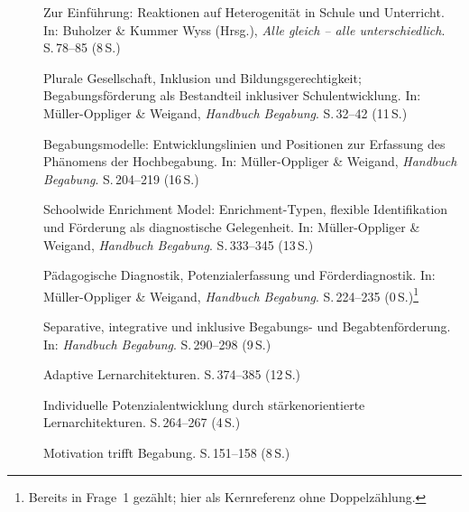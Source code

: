 \documentclass[ngerman, a4paper]{article}
\begin{document}
\begin{description}
  \item[\cite{buholzerkummerwyss2010reaktionen}]
        Zur Einführung: Reaktionen auf Heterogenität in Schule und Unterricht.
        In: Buholzer \& Kummer Wyss (Hrsg.),
        \textit{Alle gleich -- alle unterschiedlich}. S.\,78--85 (8\,S.)

  \item[\cite{muelleroppliger2021plurale}]
        Plurale Gesellschaft, Inklusion und Bildungsgerechtigkeit;
        Begabungsförderung als Bestandteil inklusiver Schulentwicklung.
        In: Müller-Oppliger \& Weigand, \textit{Handbuch Begabung}.
        S.\,32--42 (11\,S.)

  \item[\cite{muelleroppliger2021begabungsmodelle}]
        Begabungsmodelle: Entwicklungslinien und Positionen zur Erfassung
        des Phänomens der Hochbegabung.
        In: Müller-Oppliger \& Weigand, \textit{Handbuch Begabung}.
        S.\,204--219 (16\,S.)

  \item[\cite{reisrenzullimueller2021sem}]
        Schoolwide Enrichment Model: Enrichment-Typen, flexible
        Identifikation und Förderung als diagnostische Gelegenheit.
        In: Müller-Oppliger \& Weigand, \textit{Handbuch Begabung}.
        S.\,333--345 (13\,S.)

  \item[\cite{muelleroppliger2021paeddiagnostik}]
        Pädagogische Diagnostik, Potenzialerfassung und Förderdiagnostik.
        In: Müller-Oppliger \& Weigand, \textit{Handbuch Begabung}.
        S.\,224--235 (0\,S.)\footnote{Bereits in Frage~1 gezählt; hier als Kernreferenz
          ohne Doppelzählung.}

  \item[\cite{weigand2021separativ}]
        Separative, integrative und inklusive Begabungs- und
        Begabtenförderung.
        In: \textit{Handbuch Begabung}.
        S.\,290--298 (9\,S.)

  \item[\cite{muelleroppliger2021adaptive}]
        Adaptive Lernarchitekturen.
        S.\,374--385 (12\,S.)

  \item[\cite{schulteterhardt2020potenzialentwicklung}]
        Individuelle Potenzialentwicklung durch stärkenorientierte Lernarchitekturen.
        S.\,264--267 (4\,S.)

  \item[\cite{lehwald2017motivation}]
        Motivation trifft Begabung.
        S.\,151--158 (8\,S.)


\end{description}
\end{document}
